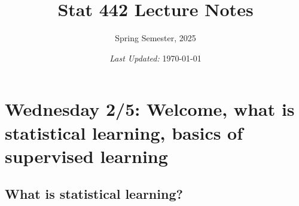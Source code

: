 \documentclass[titlepage,10pt]{scrartcl}
\title{Stat 442 Lecture Notes}
\subtitle{Spring Semester, 2025}
\date{\small\emph{Last Updated:} \today}
\newcommand{\goal}[2]{\item[\IfEqCase{#1}{{0}{{\Large\HollowBox}}{1}{{\Large\CrossedBox}}}] #2}
\newcommand{\logentry}[2]{\paragraph{{#1:}} #2}
\begin{document}
\maketitle

%
%

\hrulefill
\section{Wednesday 2/5: Welcome, what is statistical learning, basics of supervised learning}

\subsection{What is statistical learning?}
\end{document}
